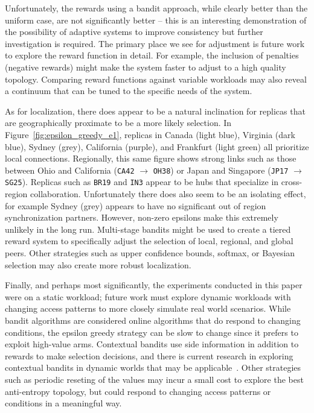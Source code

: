 Unfortunately, the rewards using a bandit approach, while clearly better
than the uniform case, are not significantly better -- this is an interesting
demonstration of the possibility of adaptive systems to improve consistency
but further investigation is required.
The primary place we see for adjustment is future work to explore the reward
function in detail.
For example, the inclusion of penalties (negative rewards) might make
the system faster to adjust to a high quality topology.
Comparing reward functions against variable workloads may also reveal a
continuum that can be tuned to the specific needs of the system.

As for localization, there does appear to be a natural inclination for
replicas that are geographically proximate to be a more likely selection.
In Figure~\ref{fig:epsilon_greedy_e1}, replicas in Canada (light blue),
Virginia (dark blue), Sydney (grey), California (purple), and Frankfurt
(light green) all prioritize local connections.
Regionally, this same figure shows strong links such as those between Ohio
and California (\texttt{CA42} $\rightarrow$ \texttt{OH38}) or Japan and
Singapore (\texttt{JP17} $\rightarrow$ \texttt{SG25}).
Replicas such as \texttt{BR19} and \texttt{IN3} appear to be hubs that
specialize in cross-region collaboration.
Unfortunately there does also seem to be an isolating effect, for example
Sydney (grey) appears to have no significant out of region synchronization
partners.
However, non-zero epsilons make this extremely unlikely in the long run.
Multi-stage bandits might be used to create a tiered reward system to
specifically adjust the selection of local, regional, and global peers.
Other strategies such as upper confidence bounds, softmax, or Bayesian
selection may also create more robust localization.

Finally, and perhaps most significantly, the experiments conducted in
this paper were on a static workload; future work must explore dynamic
workloads with changing access patterns to more closely simulate real
world scenarios.
While bandit algorithms are considered online algorithms that do respond
to changing conditions, the epsilon greedy strategy can be slow to change
since it prefers to exploit high-value arms.
Contextual bandits use side information in addition to rewards to make
selection decisions, and there is current research in exploring contextual
bandits in dynamic worlds that may be applicable~\cite{contextual_bandits}.
Other strategies such as periodic reseting of the values may incur a small
cost to explore the best anti-entropy topology, but could respond to changing
access patterns or conditions in a meaningful way.

